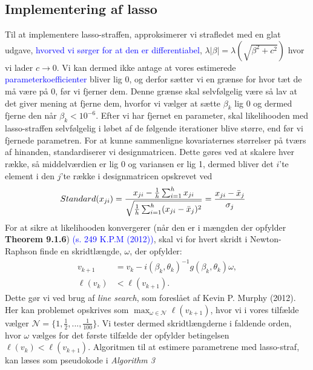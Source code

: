 \documentclass[11pt,a4paper]{article}
\begin{document}
\subsection{Implementering af lasso}
Til at implementere lasso-straffen, approksimerer vi strafledet med en glat udgave, \textcolor{blue}{hvorved vi sørger for at den er differentiabel}, $\lambda |\beta| = \lambda(\sqrt{\beta^2+c^2})$ hvor vi lader $c\rightarrow 0$. Vi kan dermed ikke antage at vores estimerede \textcolor{blue}{parameterkoefficienter} bliver lig 0, og derfor sætter vi en grænse for hvor tæt de må være på 0, før vi fjerner dem. Denne grænse skal selvfølgelig være så lav at det giver mening at fjerne dem, hvorfor vi vælger at sætte $\beta_k$ lig 0 og dermed fjerne den når $\beta_k<10^{-6}$. Efter vi har fjernet en parameter, skal likelihooden med lasso-straffen selvfølgelig i løbet af de følgende iterationer blive større, end før vi fjernede parametren. For at kunne sammenligne kovariaternes størrelser på tværs af hinanden, standardiserer vi designmatricen. Dette gøres ved at skalere hver række, så middelværdien er lig 0 og variansen er lig 1, dermed bliver det $i$'te element i den $j$'te række i designmatricen opskrevet ved 
\begin{align*}
    Standard(x_{ji}) &= \frac{x_{ji}-\frac{1}{h}\sum_{i=1}^h{x_{ji}}}{\sqrt{\frac{1}{h}\sum_{i=1}^h(x_{ji}-\Bar{x}_j)^2}}=\frac{x_{ji}-\Bar{x}_j}{\sigma_j}
\end{align*}
For at sikre at likelihooden konvergerer (når den er i mængden der opfylder \textbf{Theorem 9.1.6}) \textcolor{blue}{(s. 249 K.P.M (2012))}, skal vi for hvert skridt i Newton-Raphson finde en skridtlængde, $\omega$, der opfylder:\\
\begin{align*}
    v_{k+1} &= v_{k} -  i(\beta_k,\theta_k)^{-1}g(\beta_k,\theta_k)\omega,\\
    \ell(v_{k}) &< \ell(v_{k+1}).
\end{align*}
Dette gør vi ved brug af \textit{line search}, som foreslået af Kevin P. Murphy (2012). Her kan problemet opskrives som 
$\max_{\omega \in \mathcal{N}} \ell(v_{k+1})$, hvor vi i vores tilfælde vælger 
$\mathcal{N} = \{1,\frac{1}{2},...,\frac{1}{100}\}$. Vi tester dermed skridtlængderne i faldende orden, hvor $\omega$ vælges for det første tilfælde der opfylder betingelsen $\ell(v_k)<\ell(v_{k+1})$. Algoritmen til at estimere parametrene med lasso-straf, kan læses som pseudokode i \textit{Algorithm 3}\\
\end{document}
